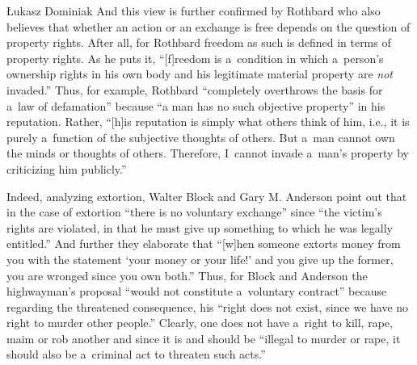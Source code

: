 \begin{artengenv}{Łukasz Dominiak}
And this view is further confirmed by Rothbard who also believes that whether an action or an exchange is free depends on the question of property rights. After all, for Rothbard freedom as such is defined in terms of property rights. As he 
\parencite*[][p.50]{rothbard_for_2006} %
 puts it, ``[f]reedom is a~condition in which a~person's ownership rights in his own body and his legitimate material property are \textit{not} invaded.'' Thus, for example, Rothbard 
\parencite*[][pp.182–183]{rothbard_man_2009} %
 ``completely overthrows the basis for a~law of defamation'' because ``a man has no such objective property'' in his reputation. Rather, ``[h]is reputation is simply what others think of him, i.e., it is purely a~function of the subjective thoughts of others. But a~man cannot own the minds or thoughts of others. Therefore, I~cannot invade a~man's property by criticizing him publicly.''



Indeed, analyzing extortion, Walter Block and Gary M. Anderson 
\parencite*[][p.546]{block_blackmail_2000} %
 point out that in the case of extortion ``there is no voluntary exchange'' since ``the victim's rights are violated, in that he must give up something to which he was legally entitled.'' And further they 
\parencite*[][p.546]{block_blackmail_2000} %
 elaborate that ``[w]hen someone extorts money from you with the statement ‘your money or your life!' and you give up the former, you are wronged since you own both.'' Thus, for Block and Anderson 
\parencite*[][p.545]{block_blackmail_2000} %
 the highwayman's proposal ``would not constitute a~voluntary contract'' because regarding the threatened consequence, his ``right does not exist, since we have no right to murder other people.'' Clearly, one does not have a~right to kill, rape, maim or rob another and since it is and should be ``illegal to murder or rape, it should also be a~criminal act to threaten such acts.'' 
\parencite[][p.543]{block_blackmail_2000}%





\end{artengenv}
